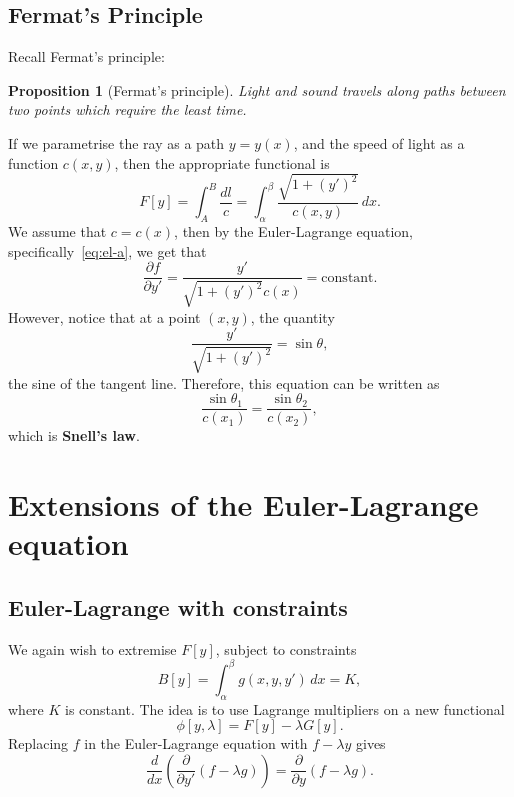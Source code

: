 \documentclass[12pt]{article}
\newtheorem{proposition}{Proposition}[section]
\theoremstyle{definition}
\theoremstyle{remark}
\begin{document}
\subsection{Fermat's Principle}%
\label{sub:fermat_s_principle}

Recall Fermat's principle:

\begin{proposition}[Fermat's principle]
	Light and sound travels along paths between two points which require the least time.
\end{proposition}

If we parametrise the ray as a path $y = y(x)$, and the speed of light as a function $c(x, y)$, then the appropriate functional is
\[
	F[y] = \int_{A}^{B} \frac{dl}{c} = \int_{\alpha}^{\beta} \frac{\sqrt{1 + (y')^2}}{c(x, y)}\, dx
.\]
We assume that $c = c(x)$, then by the Euler-Lagrange equation, specifically~\eqref{eq:el-a}, we get that
\[
	\frac{\partial f}{\partial y'} = \frac{y'}{\sqrt{1 + (y')^2} c(x)} = \text{constant}
.\]
However, notice that at a point $(x, y)$, the quantity
\[
	\frac{y'}{\sqrt{1 + (y')^2}} = \sin \theta
,\]
the sine of the tangent line. Therefore, this equation can be written as
\[
	\frac{\sin \theta_1}{c(x_1)} = \frac{\sin \theta_2}{c(x_2)}
,\]
which is \textbf{Snell's law}.

\newpage

\section{Extensions of the Euler-Lagrange equation}%
\label{sec:extensions_of_the_euler_lagrange_equation}

\subsection{Euler-Lagrange with constraints}%
\label{sub:euler_lagrange_with_constraints}

We again wish to extremise $F[y]$, subject to constraints
\[
	B[y] = \int_{\alpha}^{\beta} g(x, y, y') \, dx = K
,\]
where $K$ is constant. The idea is to use Lagrange multipliers on a new functional
\[
	\phi[y, \lambda] = F[y] - \lambda G[y]
.\]
Replacing $f$ in the Euler-Lagrange equation with $f - \lambda y$ gives
\[
	\frac{d}{dx} \left( \frac{\partial}{\partial y'} (f - \lambda g) \right) = \frac{\partial}{\partial y} (f - \lambda g) \tag{3.1}\label{eq:el-e1}
.\]
\end{document}
